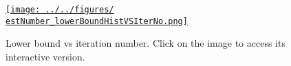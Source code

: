 \documentclass[12pt]{article}
\newcommand{\estNumber}{96129535}
\begin{document}
\listoffigures

\begin{comment}

\begin{figure}
    \begin{center}

        \href{http://www.gatsby.ucl.ac.uk/~rapela/sthita/reports/firstReport/figures/GPe_PSTH_epochaligned__last_center_out_blocks_0_neuron000_binSize0.10.html}{\texttt{[image: ../../repository/figures/GPe\_PSTH\_epochaligned\_\_last\_center\_out\_blocks\_0\_neuron000\_binSize0.10.png]}}
        \href{http://www.gatsby.ucl.ac.uk/~rapela/sthita/reports/firstReport/figures/GPe_PSTH_epochaligned__last_center_out_blocks_0_neuron012_binSize0.10.html}{\texttt{[image: ../../repository/figures/GPe\_PSTH\_epochaligned\_\_last\_center\_out\_blocks\_0\_neuron012\_binSize0.10.png]}}
        \linebreak

        \caption{Binned spikes and PSTH (red trace) for neurons 0 (top) and 12
        (bottom). Click on the image to access its interactive version.}
        \label{fig:binnedSpikesAndPSTHsForNeurons0and12}

    \end{center}
\end{figure}

\end{comment}

\begin{comment}

\begin{figure}
    \begin{center}

        \href{http://www.gatsby.ucl.ac.uk/~rapela/sthita/reports/firstReport/figures/modelSelectionBlock00.html}{\texttt{[image: /nfs/ghome/live/rapela/svGPFA/repos/projects/svGPFA\_basal\_ganglia/code/slurm/figures/modelSelectionBlock00.png]}}

        \caption{Model selection. I selected a model with 10
        latent variables, since at this number the lower bound stopped
        increasing substantially. Click on the
        image to access its interactive version.}
        \label{fig:modelSelection}

    \end{center}
\end{figure}

\end{comment}

\begin{figure}
    \begin{center}

        \href{http://www.gatsby.ucl.ac.uk/~rapela/sthita/reports/firstReport/figures/\estNumber_lowerBoundHistVSIterNo.html}{\texttt{[image: ../../figures/\\estNumber\_lowerBoundHistVSIterNo.png]}}

        \caption{Lower bound vs iteration number. Click on the
        image to access its interactive version.}
        \label{fig:estimation-lowerBoundVsIterNo}

    \end{center}
\end{figure}
\end{document}
